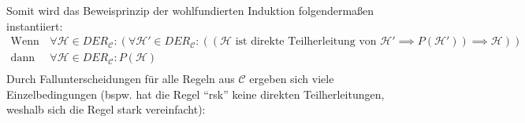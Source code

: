					Somit wird das Beweisprinzip der wohlfundierten Induktion folgendermaßen instantiiert:
					\begin{align*}
						\text{Wenn gilt:} & \,\forall \mathcal{H} \in \textit{DER} _ \mathcal{C} : (\forall \mathcal{H}' \in \textit{DER} _ \mathcal{C} : ((\mathcal{H} \text{ ist direkte Teilherleitung von } \mathcal{H}' \implies P(\mathcal{H}')) \implies \mathcal{H})) \\
						\text{dann gilt:} & \,\forall \mathcal{H} \in \textit{DER} _ \mathcal{C} : P(\mathcal{H})                                                                                                                                                             \\
					\end{align*}
					Durch Fallunterscheidungen für alle Regeln aus $ \mathcal{C} $ ergeben sich viele Einzelbedingungen (bspw. hat die Regel \enquote{rsk} keine direkten Teilherleitungen, weshalb sich die Regel stark vereinfacht):
